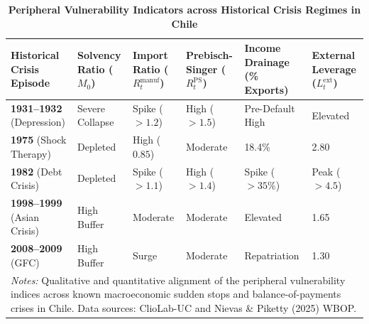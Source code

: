 \documentclass[11pt]{article}
\begin{document}
\begin{table}[H]
    \centering
    \caption{\textbf{Peripheral Vulnerability Indicators across Historical Crisis Regimes in Chile}}
    \label{tab:crisis_matrix}
    \vspace{0.2cm}
    \begin{tabular}{p{3.0cm} p{2.2cm} p{2.2cm} p{2.2cm} p{2.2cm} p{2.5cm}}
        \toprule
        \textbf{Historical Crisis Episode} & \textbf{Solvency Ratio ($M_0$)} & \textbf{Import Ratio ($R_t^{\text{manuf}}$)} & \textbf{Prebisch-Singer ($R_t^{\text{PS}}$)} & \textbf{Income Drainage (\% Exports)} & \textbf{External Leverage ($L_t^{\text{ext}}$)} \\
        \midrule
        \textbf{1931–1932} (Depression)   & Severe Collapse & Spike ($>1.2$) & High ($>1.5$) & Pre-Default High & Elevated \\
        \textbf{1975} (Shock Therapy)     & Depleted        & High ($0.85$)  & Moderate      & 18.4\%           & 2.80 \\
        \textbf{1982} (Debt Crisis)       & Depleted        & Spike ($>1.1$) & High ($>1.4$) & Spike ($>35\%$)  & Peak ($>4.5$) \\
        \textbf{1998–1999} (Asian Crisis) & High Buffer     & Moderate       & Moderate      & Elevated         & 1.65 \\
        \textbf{2008–2009} (GFC)          & High Buffer     & Surge          & Moderate      & Repatriation     & 1.30 \\
        \bottomrule
        \multicolumn{6}{p{15.3cm}}{\footnotesize \textit{Notes:} Qualitative and quantitative alignment of the peripheral vulnerability indices across known macroeconomic sudden stops and balance-of-payments crises in Chile. Data sources: ClioLab-UC and Nievas \& Piketty (2025) WBOP.}
    \end{tabular}
\end{table}
\end{document}
